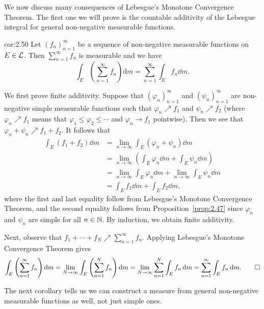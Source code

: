 We now discuss many consequences of Lebesgue's Monotone Convergence Theorem. 
The first one we will prove is the countable additivity of the Lebesgue 
integral for general non-negative measurable functions. 

\begin{cor}{cor:2.50}
    Let $(f_n)_{n=1}^\infty$ be a sequence of non-negative measurable functions
    on $E \in {\cal L}$. Then $\sum_{n=1}^\infty f_n$ is measurable and we have 
    \[ \int_E \left( \sum_{n=1}^\infty f_n \right) \textrm{d}m 
    = \sum_{n=1}^\infty \int_E f_n\dd m. \] 
\end{cor}
\begin{pf}
    We first prove finite additivity. Suppose that $(\varphi_n)_{n=1}^\infty$ 
    and $(\psi_n)_{n=1}^\infty$ are non-negative simple measurable 
    functions such that $\varphi_n \nearrow f_1$ and $\psi_n \nearrow f_2$
    (where $\varphi_n \nearrow f_1$ means that $\varphi_1 \leq 
    \varphi_2 \leq \cdots$ and $\varphi_n \to f_1$ pointwise). Then 
    we see that $\varphi_n + \psi_n \nearrow f_1 + f_2$. It follows that 
    \begin{align*}
        \int_E (f_1 + f_2)\dd m 
        &= \lim_{n\to\infty} \int_E (\varphi_n + \psi_n)\dd m \\ 
        &= \lim_{n\to\infty} \left( \int_E \varphi_n\dd m + \int_E 
        \psi_n\dd m \right) \\ 
        &= \lim_{n\to\infty} \int_E \varphi_n\dd m + \lim_{n\to\infty} 
        \int_E \psi_n\dd m \\ 
        &= \int_E f_1\dd m + \int_E f_2\dd m, 
    \end{align*}
    where the first and last equality follow from Lebesgue's Monotone Convergence 
    Theorem, and the second equality follows from Proposition~\ref{prop:2.47}
    since $\varphi_n$ and $\psi_n$ are simple for all $n \in \mathbb{N}$. 
    By induction, we obtain finite additivity. 

    Next, observe that $f_1 + \cdots + f_N \nearrow \sum_{n=1}^\infty f_n$. 
    Applying Lebesgue's Monotone Convergence Theorem gives 
    \[ \int_E \left( \sum_{n=1}^\infty f_n \right) \textrm{d}m 
    = \lim_{N\to\infty} \int_E \left( \sum_{n=1}^N f_n \right) 
    \textrm{d}m = \lim_{N\to\infty} \sum_{n=1}^N \int_E f_n\,\mathrm{d} m 
    = \sum_{n=1}^\infty \int_E f_n\,\mathrm{d} m. \qedhere \] 
\end{pf}

The next corollary tells us we can construct a measure from general 
non-negative measurable functions as well, not just simple ones. 

